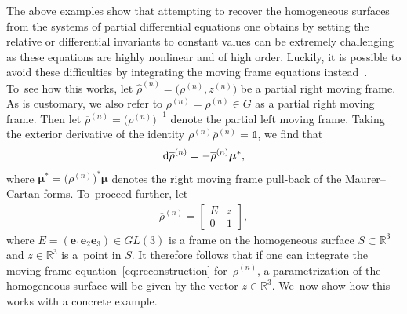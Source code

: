 \documentclass[10pt,a4paper]{amsart}
\numberwithin{equation}{section}
\newcommand{\bmu}{\boldsymbol{\mu}}
\newcommand{\n}{^{(n)}}
\newcommand{\ve}{\mathbf{e}}
\begin{document}
The above examples show that attempting to recover the homogeneous surfaces from the systems of partial differential equations one obtains by setting the relative or differential invariants to constant values can be extremely challenging as these equations are highly nonlinear and of high order. Luckily, it is possible to avoid these difficulties by integrating the moving frame equations instead~\cite{G-1963}. To~see how this works, let $\widehat{\rho}\n=\big(\rho\n,z\n\big)$ be a partial right moving frame. As is customary, we also refer to $\rho\n=\rho\n \in G$ as a partial right moving frame. Then let $\overline{\rho}\n = \big(\rho\n\big)^{-1}$ denote the partial left moving frame. Taking the exterior derivative of the identity $\rho\n\overline{\rho}\n = \mathds{1}$, we find that
%
\begin{gather}\label{eq:reconstruction}
{\rm d}\overline{\rho}\n = -\overline{\rho}\n \bmu^*,
\end{gather}
%
where $\bmu^*=\big(\rho\n\big)^*\bmu$ denotes the right moving frame pull-back of the Maurer--Cartan forms. To~proceed further, let
\begin{gather*}
\overline{\rho}\n = \begin{bmatrix}
E & z \\
0 & 1
\end{bmatrix}\!,
\end{gather*}
where $E=(\ve_1 \ve_2 \ve_3)\in GL(3)$ is a frame on the homogeneous surface $S\subset \mathbb{R}^3$ and $z\in \mathbb{R}^3$ is a~point in $S$. It therefore follows that if one can integrate the moving frame equation~\eqref{eq:reconstruction} for~$\overline{\rho}\n$, a parametrization of the homogeneous surface will be given by the vector $z\in \mathbb{R}^3$. We~now show how this works with a concrete example.
\end{document}
